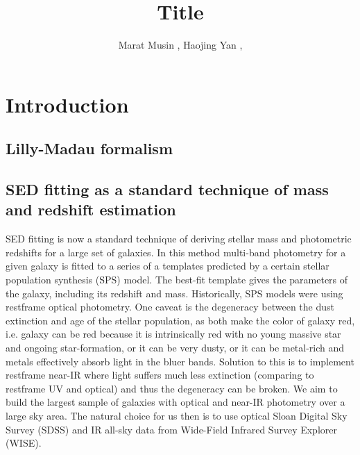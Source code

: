 \documentclass[numberedappendix,apj,twocolumn]{emulateapj}
\begin{document}

\title{Title
}
\author{Marat Musin  , 
Haojing Yan , 
}




\begin{abstract}


\end{abstract}


\section{Introduction}

\subsection{Lilly-Madau formalism}


\subsection{SED fitting as a standard technique of mass and redshift estimation}
SED fitting is now a standard technique of deriving stellar mass and photometric redshifts for a large set of galaxies. In this method multi-band photometry for a given galaxy is fitted to a series of a templates predicted by a certain stellar population synthesis (SPS) model. The best-fit template gives the parameters of the galaxy, including its redshift and mass.
Historically, SPS models were using restframe optical photometry. One caveat is the degeneracy between the dust extinction and age of the stellar population, as both make the color of galaxy red, i.e. galaxy can be red because it is intrinsically red with no young massive star and ongoing star-formation, or it can be very dusty, or it can be metal-rich and metals effectively absorb light in the bluer bands. Solution to this is to implement restframe near-IR where light suffers much less extinction (comparing to restframe UV and optical) and thus the degeneracy can be broken.
We aim to build the largest sample of galaxies with optical and near-IR photometry over a large sky area. The natural choice for us then is to use optical Sloan Digital Sky Survey (SDSS) and IR all-sky data from Wide-Field Infrared Survey Explorer (WISE).
\end{document}
